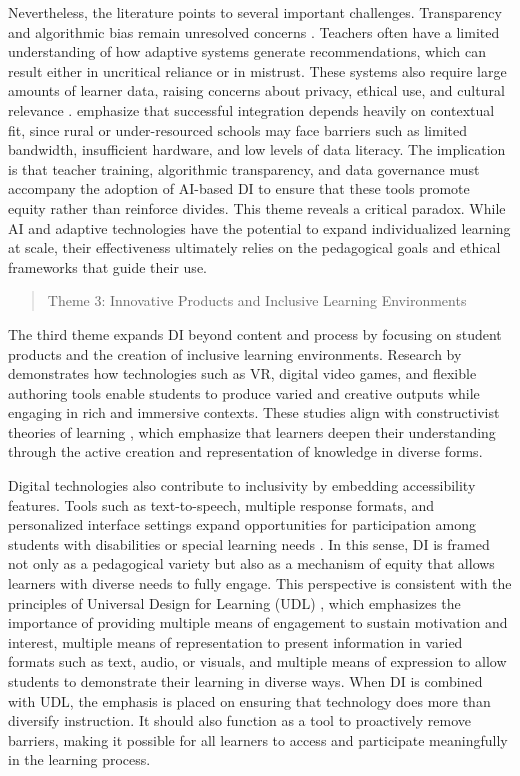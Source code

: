 \documentclass[english]{textolivre}
\begin{document}
Nevertheless, the literature points to several important challenges. Transparency and algorithmic bias remain unresolved concerns \cite{chang2023, murtaza2022}. Teachers often have a limited understanding of how adaptive systems generate recommendations, which can result either in uncritical reliance or in mistrust. These systems also require large amounts of learner data, raising concerns about privacy, ethical use, and cultural relevance \cite{giannakos2025}. \textcite{heinrich2019} emphasize that successful integration depends heavily on contextual fit, since rural or under-resourced schools may face barriers such as limited bandwidth, insufficient hardware, and low levels of data literacy. The implication is that teacher training, algorithmic transparency, and data governance must accompany the adoption of AI-based DI to ensure that these tools promote equity rather than reinforce divides. This theme reveals a critical paradox. While AI and adaptive technologies have the potential to expand individualized learning at scale, their effectiveness ultimately relies on the pedagogical goals and ethical frameworks that guide their use.

\begin{quote}
    Theme 3: Innovative Products and Inclusive Learning Environments
\end{quote}

The third theme expands DI beyond content and process by focusing on student products and the creation of inclusive learning environments. Research by \textcite{wu2019, estaiteyeh2023, spyropoulou2025} demonstrates how technologies such as VR, digital video games, and flexible authoring tools enable students to produce varied and creative outputs while engaging in rich and immersive contexts. These studies align with constructivist theories of learning \cite{bruner1996, piaget1972}, which emphasize that learners deepen their understanding through the active creation and representation of knowledge in diverse forms.

Digital technologies also contribute to inclusivity by embedding accessibility features. Tools such as text-to-speech, multiple response formats, and personalized interface settings expand opportunities for participation among students with disabilities or special learning needs \cite{damyanov2024}. In this sense, DI is framed not only as a pedagogical variety but also as a mechanism of equity that allows learners with diverse needs to fully engage. This perspective is consistent with the principles of Universal Design for Learning (UDL) \cite{cast2018}, which emphasizes the importance of providing multiple means of engagement to sustain motivation and interest, multiple means of representation to present information in varied formats such as text, audio, or visuals, and multiple means of expression to allow students to demonstrate their learning in diverse ways. When DI is combined with UDL, the emphasis is placed on ensuring that technology does more than diversify instruction. It should also function as a tool to proactively remove barriers, making it possible for all learners to access and participate meaningfully in the learning process.
\end{document}

